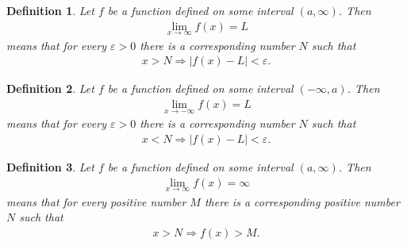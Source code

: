 \documentclass{article}
\theoremstyle{sltheorem}
\newtheorem{definition}{Definition}[section]
\begin{document}
\begin{definition}
    Let $f$ be a function defined on some interval $(a, \infty)$. Then
    \begin{align*}
        \lim_{x\to\infty}f(x)=L
    \end{align*}
    means that for every $\varepsilon>0$ there is a corresponding number $N$ such that
    \begin{align*}
        x>N\Rightarrow|f(x)-L|<\varepsilon.
    \end{align*}
\end{definition}
\begin{definition}
    Let $f$ be a function defined on some interval $(-\infty, a)$. Then
    \begin{align*}
        \lim_{x\to-\infty}f(x)=L
    \end{align*}
    means that for every $\varepsilon>0$ there is a corresponding number $N$ such that
    \begin{align*}
        x<N\Rightarrow |f(x)-L|<\varepsilon.
    \end{align*}
\end{definition}
\begin{definition}
    Let $f$ be a function defined on some interval $(a, \infty)$. Then
    \begin{align*}
        \lim_{x\to\infty}f(x)=\infty
    \end{align*}
    means that for every positive number $M$ there is a corresponding positive number $N$ such that
    \begin{align*}
        x>N\Rightarrow f(x)>M.
    \end{align*}
\end{definition}
\end{document}
